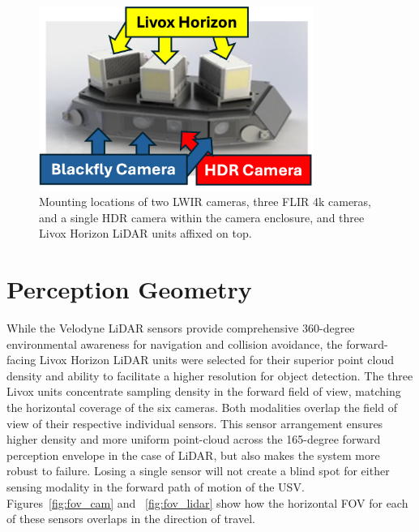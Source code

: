 \documentclass{erauthesis}
\begin{document}
\begin{figure}[htbp]
\centering
\includegraphics[width=0.8\textwidth]{Images/Camera_enclosure2.png}
\caption{Mounting locations of two LWIR cameras, three FLIR 4k cameras, and a single HDR camera within the camera enclosure, and three Livox Horizon LiDAR units affixed on top.}
\label{fig:camera_enclosure}
\end{figure}
        
\section{Perception Geometry}

While the Velodyne \ac{LiDAR} sensors provide comprehensive 360-degree environmental awareness for navigation and collision avoidance, the forward-facing Livox Horizon \ac{LiDAR} units were selected for their superior point cloud density and ability to facilitate a higher resolution for object detection.
The three Livox units concentrate sampling density in the forward field of view, matching the horizontal coverage of the six cameras.
Both modalities overlap the field of view of their respective individual sensors.
This sensor arrangement ensures higher density and more uniform point-cloud across the 165-degree forward perception envelope in the case of \ac{LiDAR}, but also makes the system more robust to failure.
Losing a single sensor will not create a blind spot for either sensing modality in the forward path of motion of the \ac{USV}. 
Figures~\ref{fig:fov_cam} and ~\ref{fig:fov_lidar} show how the horizontal \ac{FOV} for each of these sensors overlaps in the direction of travel.
\end{document}
